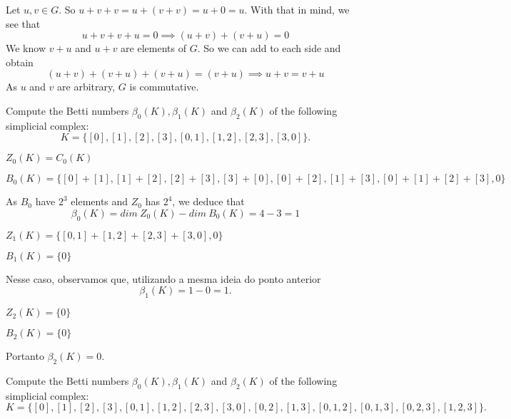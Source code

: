 Let $u,v \in G$. So $u + v + v = u + (v + v) = u + 0 = u$. With that in mind,
we see that 
$$
u + v + v + u = 0 \implies (u + v) + (v + u) = 0 
$$
We know $v + u$ and $u + v$ are elements of $G$. So we can add to each side
and obtain 
$$
(u + v) + (v + u) + (v + u) = (v + u) \implies u + v = v + u
$$
As $u$ and $v$ are arbitrary, $G$ is commutative. 

\begin{exercise}
    Compute the Betti numbers $\beta_0(K), \beta_1(K)$ and $\beta_2(K)$ of the
    following simplicial complex:
    $$
    K = \{[0], [1], [2], [3], [0, 1], [1, 2], [2, 3], [3, 0]\}.
    $$
\end{exercise}

$Z_0(K) = C_0(K)$

$B_0(K) = \{[0] + [1], [1] + [2], [2] + [3], [3] + [0], [0] + [2], [1] + [3],
[0] + [1] + [2] + [3], 0\}$

As $B_0$ have $2^3$ elements and $Z_0$ has $2^4$, we deduce that 
$$\beta_0(K) = dim ~Z_0(K) - dim ~B_0(K) = 4 - 3 = 1$$

$Z_1(K) = \{[0,1] + [1,2] + [2,3] + [3,0], 0\}$

$B_1(K) = \{0\}$

Nesse caso, observamos que, utilizando a mesma ideia do ponto anterior 
$$\beta_1(K) = 1 - 0 = 1.$$

$Z_2(K) = \{0\}$

$B_2(K) = \{0\}$

Portanto $\beta_2(K) = 0$. 


\begin{exercise}
    Compute the Betti numbers $\beta_0(K), \beta_1(K)$ and $\beta_2(K)$ of the
    following simplicial complex:
    $$
    K = \{[0], [1], [2], [3], [0, 1], [1, 2], [2, 3], [3, 0], [0, 2], [1, 3], [0, 1, 2], [0, 1, 3], [0, 2, 3], [1, 2, 3]\}.
    $$
\end{exercise}

